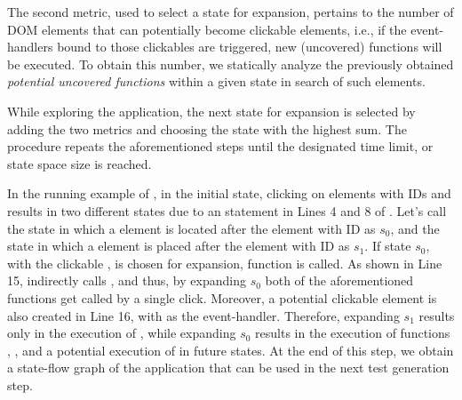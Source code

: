 The second metric, used to select a state for expansion, pertains to the number of DOM elements that can potentially become clickable elements, i.e., if the event-handlers bound to those clickables are triggered, new (uncovered) functions will be executed. To obtain this number, we statically analyze the previously obtained \emph{potential uncovered functions} within a given state in search of such elements.

While exploring the application, the next state for expansion is selected by adding the two metrics 
and choosing the state with the highest sum.
%
The procedure repeats the aforementioned steps until the designated time limit, or state space size is reached. %

In the running example of , in the initial state, clicking on elements with IDs  and  results in two different states due to an  statement in Lines 4 and 8 of . Let's call the state in which a  element is located after the element with ID  as $s_0$, and the state in which a  element is placed after the element with ID   as $s_1$. If state $s_0$, with the clickable , is chosen for expansion, function  is called. As shown in Line 15,  indirectly calls , and thus, by expanding $s_0$ both of the aforementioned functions get called by a single click. Moreover, a potential clickable element is also created in Line 16, with  as the event-handler. Therefore,  expanding $s_1$  results only in the execution of , while expanding $s_0$ results in the execution of functions , , and a potential execution of  in future states. 
At the end of this step, we obtain a state-flow graph of the application that can be used in the next test generation step.